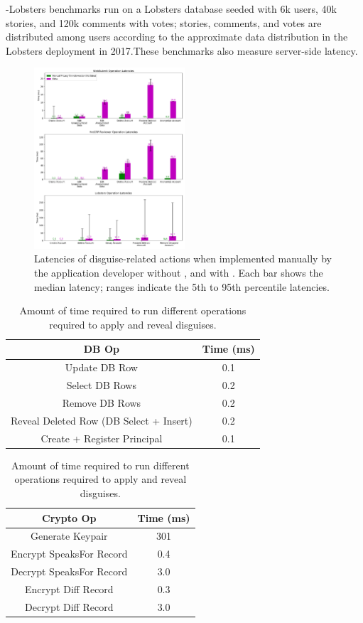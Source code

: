 \sys-Lobsters benchmarks run on a Lobsters database seeded with 6k users, 40k stories, and 120k
comments with votes; stories, comments, and votes are distributed among users according to the
approximate data distribution in the Lobsters deployment in 2017.These benchmarks also
measure server-side latency.

\begin{figure}[t!]
    \centering
    \includegraphics[width=0.5\textwidth]{figs/client_op_stats}
    \caption{Latencies of disguise-related actions when implemented manually by the
    application developer without \sys, and with \sys.
    Each bar shows the median latency; ranges indicate the 5th to 95th
    percentile latencies.  }
    \label{fig:client_opstats}
\end{figure}

\begin{table}[h!]
\begin{center}
\begin{tabular}{ c c }
\textbf{DB Op} & \textbf{Time (ms)}\\
\hline
Update DB Row & 0.1\\
Select DB Rows & 0.2\\
Remove DB Rows & 0.2\\
Reveal Deleted Row (DB Select + Insert) & 0.2 \\
Create + Register Principal & 0.1\\
\end{tabular}
\quad
\begin{tabular}{ c c }
\textbf{Crypto Op} & \textbf{Time (ms)}\\
\hline
Generate Keypair & 301\\
Encrypt SpeaksFor Record & 0.4\\
Decrypt SpeaksFor Record & 3.0\\
Encrypt Diff Record & 0.3\\
Decrypt Diff Record & 3.0\\
\end{tabular}
\end{center}
\caption{Amount of time required to run different operations required to apply and reveal disguises.}
\label{tab:opstats}
\end{table}

